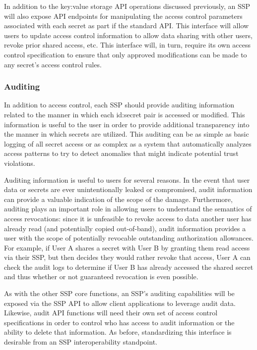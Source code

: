 In addition to the key:value storage API operations discussed
previously, an SSP will also expose API endpoints for manipulating the
access control parameters associated with each secret as part if the
standard API. This interface will allow users to update access control
information to allow data sharing with other users, revoke prior
shared access, etc. This interface will, in turn, require its own
access control specification to ensure that only approved
modifications can be made to any secret's access control rules.

\subsubsection{Auditing}

In addition to access control, each SSP should provide auditing
information related to the manner in which each id:secret pair is
accessed or modified. This information is useful to the user in order
to provide additional transparency into the manner in which secrets
are utilized. This auditing can be as simple as basic logging of all
secret access or as complex as a system that automatically analyzes
access patterns to try to detect anomalies that might indicate
potential trust violations.

Auditing information is useful to users for several reasons. In the
event that user data or secrets are ever unintentionally leaked or
compromised, audit information can provide a valuable indication of
the scope of the damage. Furthermore, auditing plays an important role
in allowing users to understand the semantics of access revocations:
since it is unfeasible to revoke access to data another user has
already read (and potentially copied out-of-band), audit information
provides a user with the scope of potentially revocable outstanding
authorization allowances. For example, if User A shares a secret with
User B by granting them read access via their SSP, but then decides
they would rather revoke that access, User A can check the audit logs
to determine if User B has already accessed the shared secret and thus
whether or not guaranteed revocation is even possible.

As with the other SSP core functions, an SSP's auditing capabilities
will be exposed via the SSP API to allow client applications to
leverage audit data. Likewise, audit API functions will need their own
set of access control specifications in order to control who has
access to audit information or the ability to delete that
information. As before, standardizing this interface is desirable from
an SSP interoperability standpoint.

